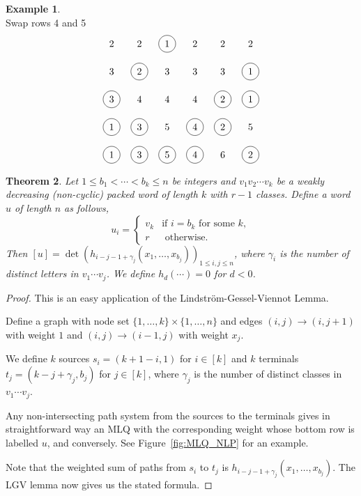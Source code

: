 \documentclass[reqno]{amsart}
\newcommand{\0}{\phantom{c}}
\theoremstyle{plain}
\newtheorem{thm}{Theorem}[section]
\theoremstyle{definition}
\newtheorem{example}[thm]{Example}
\numberwithin{equation}{section}
\begin{document}
\begin{example}
\[\]
Swap rows 4 and 5
\[
\begin{tikzpicture}\node at (0, 5){2};\node at (1, 5){2};\node[circle, draw=black] at (2, 5){1};\node at (3, 5){2};\node at (4, 5){2};\node at (5, 5){2};\node at (0, 4){3};\node[circle, draw=black] at (1, 4){2};\node at (2, 4){3};\node at (3, 4){3};\node at (4, 4){3};\node[circle, draw=black] at (5, 4){1};\node[circle, draw=black] at (0, 3){3};\node at (1, 3){4};\node at (2, 3){4};\node at (3, 3){4};\node[circle, draw=black] at (4, 3){2};\node[circle, draw=black] at (5, 3){1};\node[circle, draw=black] at (0, 2){1};\node[circle, draw=black] at (1, 2){3};\node at (2, 2){5};\node[circle, draw=black] at (3, 2){4};\node[circle, draw=black] at (4, 2){2};\node at (5, 2){5};\node[circle, draw=black] at (0, 1){1};\node[circle, draw=black] at (1, 1){3};\node[circle, draw=black] at (2, 1){5};\node[circle, draw=black] at (3, 1){4};\node at (4, 1){6};\node[circle, draw=black] at (5, 1){2};\end{tikzpicture}
\]
\end{example}


\begin{thm}
\label{thm:determinant_form}
  Let $1 \leq b_1 < \cdots < b_k \leq n$ be integers and $v_1v_2 \dotsm v_k$ be a weakly decreasing (non-cyclic) packed word of length $k$ with $r-1$ classes. Define a word $u$ of length $n$ as follows,
  \[
  u_i = \begin{cases}
  v_k & \text{if $i = b_k$ for some $k$}, \\
  r & \text{ otherwise}.
  \end{cases}
  \]
  Then $[u] = \det(h_{i-j-1+\gamma_j}(x_1, \dotsc, x_{b_j}))_{1\leq i,j\leq n}$, where $\gamma_i$ is the number of distinct letters in $v_1\dotsm v_j$. We define $h_d(\cdots) = 0$ for $d < 0$.
\end{thm}

\begin{proof}
This is an easy application of the Lindstr\"om-Gessel-Viennot Lemma.

Define a graph with node set $\{1,\dotsc,k\} \times \{1, \dotsc, n\}$ and edges $(i,j) \to (i,j+1)$ with weight $1$ and $(i,j) \to (i-1,j)$ with weight $x_j$. 

We define $k$ sources $s_i = (k+1-i, 1)$ for $i\in[k]$ and $k$ terminals $t_j = (k-j+\gamma_j,b_j)$ for $j\in[k]$, where $\gamma_j$ is the number of distinct classes in $v_1\dotsm v_j$.

Any non-intersecting path system from the sources to the terminals gives in straightforward way an MLQ with the corresponding weight whose bottom row is labelled $u$, and conversely. See Figure~\ref{fig:MLQ_NLP} for an example.

Note that the weighted sum of paths from $s_i$ to $t_j$ is $h_{i-j-1+\gamma_j}(x_1,\dots,x_{b_j})$. The LGV lemma now gives us the stated formula.
\end{proof}
\end{document}
